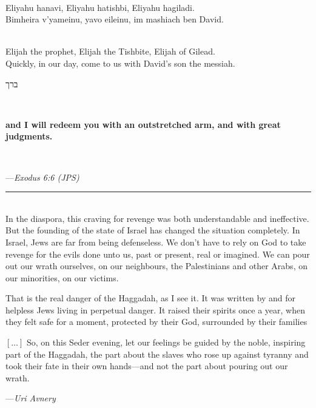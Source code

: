 \documentclass[a4paper,12pt,openany]{memoir}
\newcommand{\HgEllipsis}{\ensuremath{\left[\ldots\right]}}
\newcommand{\HgSource}[1]{\hfill{\small---\itshape{#1}}}
\newcommand{\hchapter}[1]{
  \begin{hebrew}
    \begin{Spacing}{.97}
      \newpage
      \strut

      \vspace{.15em}

      \noindent\Huge #1

      \vspace{1em}
    \end{Spacing}
  \end{hebrew}
}
\newcommand{\HgHL}[1]{{\Large\textbf{#1}\par\noindent\\[-.5em]}}
\newcommand{\HgFill}{\vfill \hrule \vfill}
\newenvironment{HgEnglish}{\strut\\\noindent}{\vspace{1em}}
\newenvironment{HgTranslit}{\strut\\\noindent\begin{itshape}}{\end{itshape}\vspace{1em}}
\begin{document}
\begin{HgTranslit}
  Eliyahu hanavi, Eliyahu hatishbi, Eliyahu hagiladi. \\
  Bimheira v'yameinu, yavo eileinu, im mashiach ben David.
\end{HgTranslit}
\vspace{-1em}

\begin{HgEnglish}
  Elijah the prophet, Elijah the Tishbite, Elijah of Gilead. \\
  Quickly, in our day, come to us with David's son the messiah.
\end{HgEnglish}

\vfill

\hchapter{ברך \\ {\LARGE \strut}}

\begin{HgEnglish}
  \HgHL{and I will redeem you with an outstretched arm, and with great
  judgments.}

  \vspace{-2em}
  \HgSource{Exodus 6:6 (JPS)}
\end{HgEnglish}

\HgFill

\begin{HgEnglish}
   In the diaspora, this craving for revenge was both understandable and
   ineffective. But the founding of the state of Israel has changed the
   situation completely. In Israel, Jews are far from being defenseless. We
   don’t have to rely on God to take revenge for the evils done unto us, past or
   present, real or imagined. We can pour out our wrath ourselves, on our
   neighbours, the Palestinians and other Arabs, on our minorities, on our
   victims.

   That is the real danger of the Haggadah, as I see it. It was written by and
   for helpless Jews living in perpetual danger. It raised their spirits once a
   year, when they felt safe for a moment, protected by their God, surrounded by
   their families


   \HgEllipsis{} So, on this Seder evening, let our feelings be guided by the
   noble, inspiring part of the Haggadah, the part about the slaves who rose up
   against tyranny and took their fate in their own hands---and not the part
   about pouring out our wrath.

   \HgSource{Uri Avnery}
\end{HgEnglish}
\end{document}
